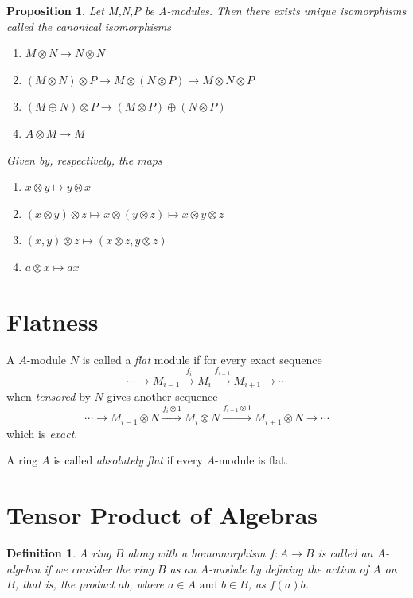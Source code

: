 \documentclass[]{report}
\newtheorem{prop}[theorem]{Proposition}
\newtheorem{defn}[theorem]{Definition}
\begin{document}
\begin{prop} 
    Let M,N,P be A-modules. Then there exists unique isomorphisms called the canonical isomorphisms 
    \begin{enumerate}
        \item $M\otimes N \rightarrow N\otimes N$  
        \item $(M\otimes N) \otimes P \rightarrow M\otimes (N\otimes P) \rightarrow M\otimes N\otimes P$
        \item $(M\oplus N) \otimes P \rightarrow (M\otimes P) \oplus (N\otimes P)$
        \item $A\otimes M \rightarrow M$
    \end{enumerate}
    Given by, respectively, the maps
    \begin{enumerate}
        \item $x\otimes y \mapsto y\otimes x$
        \item $(x\otimes y) \otimes z \mapsto x \otimes (y\otimes z) \mapsto x\otimes y \otimes z$
        \item $(x,y)\otimes z \mapsto (x\otimes z, y\otimes z)$
        \item $a\otimes x \mapsto ax$

    \end{enumerate}
    \cite{atiyah1}
\end{prop}
    
\section{Flatness}

A $A$-module $N$ is called a \textit{flat} module if for every exact sequence
$$\cdots \rightarrow M_{i-1} \xrightarrow{f_i} M_i \xrightarrow{f_{i+1}} M_{i+1} \rightarrow \cdots$$ 
when \textit{tensored} by $N$ gives another sequence
$$\cdots \rightarrow M_{i-1}\otimes N \xrightarrow{f_i \otimes 1} M_i\otimes N \xrightarrow{f_{i+1} \otimes 1} M_{i+1}\otimes N \rightarrow \cdots$$ 
which is \textit{exact}.

A ring $A$ is called \textit{absolutely flat} if every $A$-module is flat. 

\section{Tensor Product of Algebras}

\begin{defn}
    A ring $B$ along with a homomorphism $f: A \rightarrow B$ is called an $A$-algebra if we consider the ring $B$ as an $A$-module by defining the action of $A$ on $B$, that is, the product $ab$, where $a \in A \text{ and } b \in B$, as $f(a)b$.
\end{defn}
\end{document}
